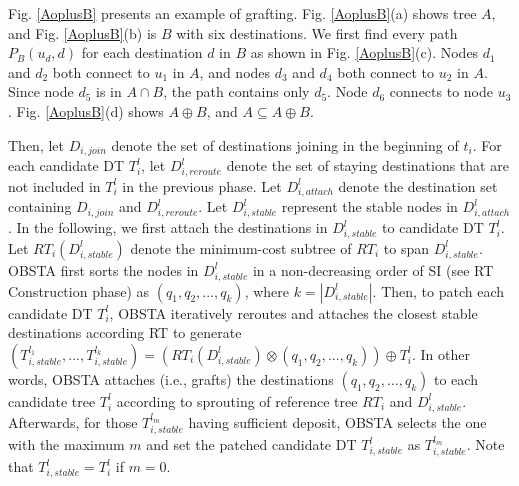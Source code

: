 \documentclass[10pt, conference, letterpaper]{IEEEtran}
\theoremstyle{definition}
\begin{document}
\begin{Example}
Fig. \ref{AoplusB} presents an example of grafting. Fig. \ref{AoplusB}(a) shows tree $A$, and Fig. \ref{AoplusB}(b) is $B$ with six destinations. We first find every path $P_{B}(u_d,d)$ for each destination $d$ in $B$ as shown in Fig. \ref{AoplusB}(c). Nodes $d_{1}$ and $d_{2}$ both connect to $u_1$ in $A$, and nodes $d_{3}$ and $d_{4}$ both connect to $u_2$ in $A$. Since node $d_5$ is in $A\cap B$, the path contains only $d_5$. Node $d_{6}$ connects to node $u_3$. Fig. \ref{AoplusB}(d) shows $A\oplus B$, and $A\subseteq A\oplus B$.
\end{Example}
Then, let $D_{i,join}$ denote the set of destinations joining in the beginning of $t_i$. For each candidate DT $T_{i}^{l}$, let $D_{i,reroute}^{l}$ denote the set of staying destinations that are not included in $T_{i}^{l}$ in the previous phase. 
Let $D_{i,attach}^{l}$ denote the destination set containing $D_{i,join}$ and $D_{i,reroute}^{l}$.
Let $D_{i,stable}^{l}$ represent the stable nodes in $D_{i,attach}^{l}$. In the following, we first attach the destinations in $D_{i,stable}^{l}$ to candidate DT $T_{i}^{l}$. Let $RT_{i}(D_{i,stable}^{l})$ denote the minimum-cost subtree of $RT_{i}$ to span $D_{i,stable}^{l}$.
OBSTA first sorts the nodes in $D_{i,stable}^{l}$ in a non-decreasing order of SI (see RT Construction phase)
as $(q_1,q_2,...,q_k)$, where $k=|D_{i,stable}^{l}|$. Then, to patch each candidate DT $T_{i}^{l}$, OBSTA iteratively reroutes and attaches the closest stable destinations according RT %
to generate %
$(T_{i,stable}^{l_{1}},...,T_{i,stable}^{l_{k}})=(RT_{i}(D_{i,stable}^{l})\otimes (q_1,q_2,...,q_k))\oplus T_{i}^{l}$. %
In other words, OBSTA attaches (i.e., grafts) the destinations $(q_1,q_2,...,q_k)$ to each candidate tree $T_{i}^{l}$ according to sprouting of reference tree $RT_i$ and $D_{i,stable}^{l}$. Afterwards, for those $T_{i,stable}^{l_m}$ having sufficient deposit, OBSTA selects the one with the maximum $m$ and set %
the patched candidate DT $T_{i,stable}^{l}$ as $T_{i,stable}^{l_m}$. Note that $T_{i,stable}^{l}=T_{i}^{l}$ if $m=0$. %
\end{document}

